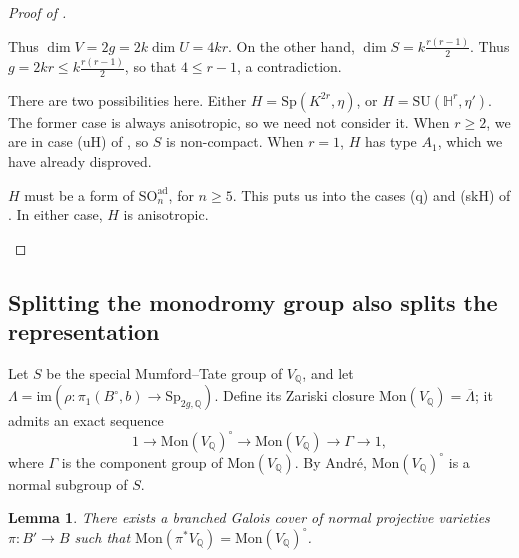 \documentclass[12pt]{amsart}
\newcommand{\Q}{\mathbb{Q}}
\newcommand{\Sp}{\mathrm{Sp}}
\newcommand{\ol}{\overline}
\newtheorem{lemma}[theorem]{Lemma}
\theoremstyle{definition}
\numberwithin{equation}{section}
\begin{document}
\begin{proof}[Proof of ]
\begin{description}
    Thus \(\dim V = 2g = 2k \dim U = 4kr\). On the other hand, \(\dim S = k\frac{r(r-1)}{2}\). 
    Thus \(g = 2kr \leq k\frac{r(r-1)}{2}\), so that \(4 \leq r-1\), a contradiction.
    \item[\(H\) has type \(\mathrm{III}\)] There are two possibilities here. Either 
    \(H = \Sp(K^{2r}, \eta)\), or \(H = \mathrm{SU}(\mathbb{H}^r, \eta')\). The 
    former case is always anisotropic, so we need not consider it. When \(r \geq 2\), 
    we are in case (uH) of , so \(S\) is 
    non-compact. When \(r = 1\), \(H\) has type \(A_1\), which we have already disproved.
    \item[\(H\) has type \(\mathrm{IV}\)] \(H\) must be a form of \(\mathrm{SO}_n^\mathrm{ad}\), 
    for \(n \geq 5\). This puts us into the cases (q) and (skH) of . 
    In either case, \(H\) is anisotropic.
\end{description}

\end{proof}










\subsection{Splitting the monodromy group also splits the representation}

Let \(S\) be the special Mumford--Tate group 
of \(V_\Q\), and let \(\Lambda = \mathrm{im}(\rho: \pi_1(B^\circ, b) \to \Sp_{2g, \Q})\). 
Define its Zariski closure \(\mathrm{Mon}(V_\Q) = \ol{\Lambda}\); it admits an exact sequence 
\begin{equation*}
    1 \to \mathrm{Mon}(V_\Q)^\circ \to \mathrm{Mon}(V_\Q) \to \Gamma \to 1,
\end{equation*}
where \(\Gamma\) is the component group of \(\mathrm{Mon}(V_\Q)\). By Andr\'e, 
\(\mathrm{Mon}(V_\Q)^\circ\) is a normal subgroup of \(S\). 

\begin{lemma}
    There exists a branched Galois cover of normal projective varieties \(\pi: B' \to B\) 
    such that \(\mathrm{Mon}(\pi^* V_\Q) = \mathrm{Mon}(V_\Q)^\circ\).
\end{lemma}
\end{document}
